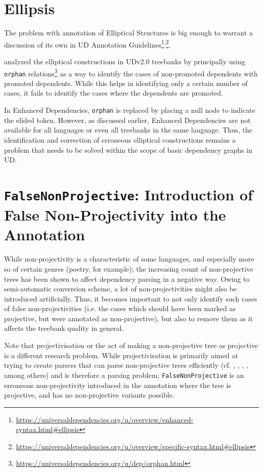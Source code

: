 \section{Ellipsis}
\label{future:ellipsis}

The problem with annotation of Elliptical Structures is big enough to warrant a discussion of its own in UD Annotation Guidelines\footnote{\url{https://universaldependencies.org/u/overview/enhanced-syntax.html\#ellipsis}}\textsuperscript{,}\footnote{\url{https://universaldependencies.org/u/overview/specific-syntax.html\#ellipsis}}. 

\cite{orphan} analyzed the elliptical constructions in UDv2.0 treebanks \citep{UDv2.0} by principally using \verb|orphan| relations\footnote{\url{https://universaldependencies.org/u/dep/orphan.html}} as a way to identify the cases of non-promoted dependents with promoted dependents. While this helps in identifying only a certain number of cases, it fails to identify the cases where the dependents are promoted. 

In Enhanced Dependencies, \verb|orphan| is replaced by placing a null node to indicate the elided token. However, as discussed earlier, Enhanced Dependencies are not available for all languages or even all treebanks in the same language. Thus, the identification and correction of erroneous elliptical constructions remains a problem that needs to be solved within the scope of basic dependency graphs in UD.

\section{\texttt{FalseNonProjective}: Introduction of False Non-Projectivity into the Annotation}
\label{future:nonproj}

While non-projectivity is a characteristic of some languages, and especially more so of certain genres (poetry, for example); the increasing count of non-projective trees has been shown to affect dependency parsing in a negative way. Owing to semi-automatic conversion scheme, a lot of non-projectivities might also be introduced artificially. Thus, it becomes important to not only identify such cases of false non-projectivities (i.e. the cases which should have been marked as projective, but were annotated as non-projective), but also to remove them as it affects the treebank quality in general.

Note that projectivisation or the act of making a non-projective tree as projective is a different research problem. While projectivisation is primarily aimed at trying to create parsers that can parse non-projective trees efficiently (cf. \citep{nivre2005pseudo}, \citep{npparser3}, \citep{npparser1}, \citep{npparser2}, among others) and is therefore a parsing problem; \texttt{FalseNonProjective} is an erroneous non-projectivity introduced in the annotation where the tree is projective, and has no non-projective variants possible.

